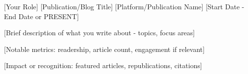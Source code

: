 

\begin{cventries}

%
  \cventry
    {[Your Role]} %
    {[Publication/Blog Title]} %
    {[Platform/Publication Name]} %
    {[Start Date - End Date or PRESENT]} %
    {
      \begin{cvitems} %
        \item {[Brief description of what you write about - topics, focus areas]}
        \item {[Notable metrics: readership, article count, engagement if relevant]}
        \item {[Impact or recognition: featured articles, republications, citations]}
      \end{cvitems}
    }


\end{cventries}
